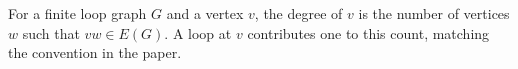 \begin{definition}
For a finite loop graph \(G\) and a vertex \(v\), the degree of \(v\) is the number of vertices \(w\) such that \(vw\in E(G)\). A loop at \(v\) contributes one to this count, matching the convention in the paper.
\end{definition}
